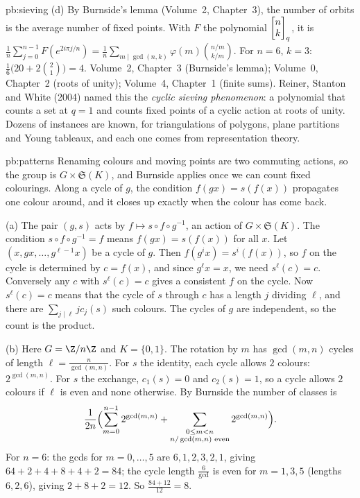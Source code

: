 \begin{solution}{pb:sieving}
(d) By Burnside's lemma (Volume~2, Chapter~3), the number of orbits is the average number of fixed points. With $F$ the polynomial $\begin{bmatrix}n\\k\end{bmatrix}_q$, it is
$\frac1n\sum_{j=0}^{n-1}F(e^{2i\pi j/n})=\frac1n\sum_{m\mid\gcd(n,k)}\varphi(m)\binom{n/m}{k/m}$. For $n=6$, $k=3$:
$\frac16\bigl(20+2\binom21\bigr)=4$.
\tools Volume~2, Chapter~3 (Burnside's lemma); Volume~0, Chapter~2 (roots of unity); Volume~4, Chapter~1 (finite sums).
\leads Reiner, Stanton and White (2004) named this the \emph{cyclic sieving phenomenon}: a polynomial that counts a set at
$q=1$ and counts fixed points of a cyclic action at roots of unity. Dozens of instances are known, for triangulations of
polygons, plane partitions and Young tableaux, and each one comes from representation theory.
\end{solution}

\begin{solution}{pb:patterns}
\idea Renaming colours and moving points are two commuting actions, so the group is $G\times\mathfrak S(K)$, and Burnside
applies once we can count fixed colourings. Along a cycle of $g$, the condition $f(gx)=s(f(x))$ propagates one colour around,
and it closes up exactly when the colour has come back.

\writeup (a) The pair $(g,s)$ acts by $f\mapsto s\circ f\circ g^{-1}$, an action of $G\times\mathfrak S(K)$. The condition
$s\circ f\circ g^{-1}=f$ means $f(gx)=s(f(x))$ for all $x$. Let $(x,gx,\dots,g^{\ell-1}x)$ be a cycle of $g$. Then
$f(g^ix)=s^i(f(x))$, so $f$ on the cycle is determined by $c=f(x)$, and since $g^\ell x=x$, we need $s^\ell(c)=c$. Conversely
any $c$ with $s^\ell(c)=c$ gives a consistent $f$ on the cycle. Now $s^\ell(c)=c$ means that the cycle of $s$ through $c$ has
a length $j$ dividing $\ell$, and there are $\sum_{j\mid\ell}jc_j(s)$ such colours. The cycles of $g$ are independent, so the
count is the product.

(b) Here $G=\Z/n\Z$ and $K=\{0,1\}$. The rotation by $m$ has $\gcd(m,n)$ cycles of length $\ell=\frac n{\gcd(m,n)}$. For $s$
the identity, each cycle allows $2$ colours: $2^{\gcd(m,n)}$. For $s$ the exchange, $c_1(s)=0$ and $c_2(s)=1$, so a cycle allows
$2$ colours if $\ell$ is even and none otherwise. By Burnside the number of classes is
\[
\frac1{2n}\Bigl(\sum_{m=0}^{n-1}2^{\gcd(m,n)}+\sum_{\substack{0\le m<n\\ n/\gcd(m,n)\text{ even}}}2^{\gcd(m,n)}\Bigr).
\]
For $n=6$: the gcds for $m=0,\dots,5$ are $6,1,2,3,2,1$, giving $64+2+4+8+4+2=84$; the cycle length $\frac6{\gcd}$ is even for
$m=1,3,5$ (lengths $6,2,6$), giving $2+8+2=12$. So $\frac{84+12}{12}=8$.


\end{solution}
